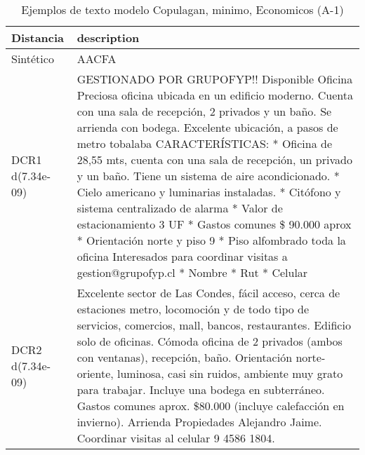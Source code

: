 \begin{table}[H]
\centering
\fontsize{10}{14}\selectfont
\caption{Ejemplos de texto modelo Copulagan, minimo, Economicos (A-1)}
\label{table-example-economicos-a-1-copulagan-min-text}
\begin{tabular}{|l|m{35em}|}
\hline
\rowcolor[gray]{0.8}
Distancia & description \\
\hline Sintético & AACFA \\
\hline DCR1 d(7.34e-09) & GESTIONADO POR GRUPOFYP!! Disponible Oficina  Preciosa oficina ubicada en un edificio moderno. Cuenta con una sala de recepci\'on, 2 privados y un ba\~no. Se arrienda con bodega. Excelente ubicaci\'on, a pasos de metro tobalaba  CARACTER\'ISTICAS:  * Oficina de 28,55 mts, cuenta con una sala de recepci\'on, un privado y un ba\~no. Tiene un sistema de aire acondicionado. * Cielo americano y luminarias instaladas. * Cit\'ofono y sistema centralizado de alarma * Valor de estacionamiento 3 UF * Gastos comunes \$ 90.000 aprox  * Orientaci\'on norte y piso 9 * Piso alfombrado toda la oficina  Interesados para coordinar visitas a gestion@grupofyp.cl * Nombre * Rut * Celular \\
\hline DCR2 d(7.34e-09) & Excelente sector de Las Condes, f\'acil acceso, cerca de estaciones metro, locomoci\'on y de todo tipo de servicios, comercios, mall, bancos, restaurantes. Edificio solo de oficinas. C\'omoda oficina de 2 privados (ambos con ventanas), recepci\'on, ba\~no. Orientaci\'on norte-oriente, luminosa, casi sin ruidos, ambiente muy grato para trabajar. Incluye una bodega en subterr\'aneo. Gastos comunes aprox. \$80.000 (incluye calefacci\'on en invierno). Arrienda Propiedades Alejandro Jaime. Coordinar visitas al celular 9 4586 1804. \\
\hline
\end{tabular}
\end{table}

